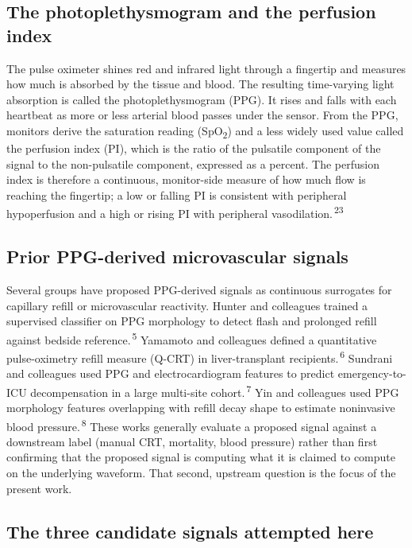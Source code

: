 \documentclass[twocolumn,letterpaper,10pt]{article}
\renewcommand{\cite}[1]{\textsuperscript{\,#1}}
\begin{document}
\subsection{The photoplethysmogram and the perfusion index}

The pulse oximeter shines red and infrared light through a fingertip and measures how much is absorbed by the tissue and blood. The resulting time-varying light absorption is called the photoplethysmogram (PPG). It rises and falls with each heartbeat as more or less arterial blood passes under the sensor. From the PPG, monitors derive the saturation reading (SpO\textsubscript{2}) and a less widely used value called the perfusion index (PI), which is the ratio of the pulsatile component of the signal to the non-pulsatile component, expressed as a percent. The perfusion index is therefore a continuous, monitor-side measure of how much flow is reaching the fingertip; a low or falling PI is consistent with peripheral hypoperfusion and a high or rising PI with peripheral vasodilation.\cite{23}

\subsection{Prior PPG-derived microvascular signals}

Several groups have proposed PPG-derived signals as continuous surrogates for capillary refill or microvascular reactivity. Hunter and colleagues trained a supervised classifier on PPG morphology to detect flash and prolonged refill against bedside reference.\cite{5} Yamamoto and colleagues defined a quantitative pulse-oximetry refill measure (Q-CRT) in liver-transplant recipients.\cite{6} Sundrani and colleagues used PPG and electrocardiogram features to predict emergency-to-ICU decompensation in a large multi-site cohort.\cite{7} Yin and colleagues used PPG morphology features overlapping with refill decay shape to estimate noninvasive blood pressure.\cite{8} These works generally evaluate a proposed signal against a downstream label (manual CRT, mortality, blood pressure) rather than first confirming that the proposed signal is computing what it is claimed to compute on the underlying waveform. That second, upstream question is the focus of the present work.

\subsection{The three candidate signals attempted here}
\end{document}
